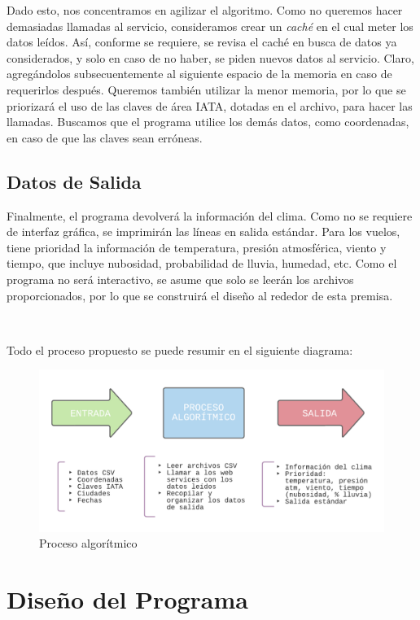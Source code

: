 \documentclass[11 pt]{article}
\theoremstyle{remark}
\begin{document}
		Dado esto, nos concentramos en agilizar el algoritmo. Como no queremos hacer demasiadas llamadas al servicio, consideramos crear un \emph{caché} en el cual meter los datos leídos. Así, conforme se requiere, se revisa el caché en busca de datos ya considerados, y solo en caso de no haber, se piden nuevos datos al servicio. Claro, agregándolos subsecuentemente al siguiente espacio de la memoria en caso de requerirlos después. Queremos también utilizar la menor memoria, por lo que se priorizará el uso de las claves de área IATA, dotadas en el archivo, para hacer las llamadas. Buscamos que el programa utilice los demás datos, como coordenadas, en caso de que las claves sean erróneas.

	
	\subsection{Datos de Salida}
	
		Finalmente, el programa devolverá la información del clima. Como no se requiere de interfaz gráfica, se imprimirán las líneas en salida estándar. Para los vuelos, tiene prioridad la información de temperatura, presión atmosférica, viento y tiempo, que incluye nubosidad, probabilidad de lluvia, humedad, etc. Como el programa no será interactivo, se asume que solo se leerán los archivos proporcionados, por lo que se construirá el diseño al rededor de esta premisa.
		
		~
		
		Todo el proceso propuesto se puede resumir en el siguiente diagrama:
		
		\begin{figure}[h]
			\centering
    	\includegraphics[scale=0.7]{fig1}
			\caption{\small Proceso algorítmico}
		\end{figure}
		
		
		
\section{Diseño del Programa}
		
\end{document}
